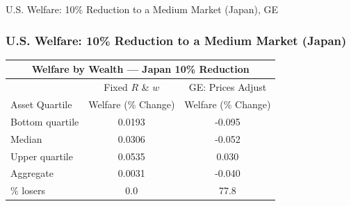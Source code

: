 \documentclass[9pt,pdftex,aspectratio=1610]{beamer}
\theoremstyle{definition}
\begin{document}
\begin{frame}[t]{U.S. Welfare: 10\% Reduction to a Medium Market (Japan), {\color{red} GE} }
\vspace{-.5cm}
\begin{figure}[!t]
\end{figure}
\end{frame}

\begin{frame}[t]
\frametitle{U.S. Welfare: 10\% Reduction to a Medium Market (Japan)}
\begin{table}[t]
\footnotesize
\setlength {\tabcolsep}{6.05mm}
\renewcommand{\arraystretch}{1.80}
\begin{center}
\begin{tabular}{l c c}
\multicolumn{3}{c}{\small \textbf{Welfare by Wealth --- Japan {\color{red} 10\%} Reduction}}\\
\hline
\hline
& \footnotesize  Fixed $R$ \& $w$ & GE: Prices Adjust \\
\cmidrule(lr){2-2}  \cmidrule(lr){3-3}
\footnotesize  Asset Quartile & \footnotesize  Welfare (\% Change) & \footnotesize  Welfare (\% Change) \\
\footnotesize  Bottom quartile  & 0.0193 & -0.095 \\
\footnotesize  Median & 0.0306 & -0.052 \\
\footnotesize  Upper quartile  & 0.0535 & 0.030  \\
\footnotesize  Aggregate & 0.0031 & -0.040 \\
\cmidrule(lr){2-2}  \cmidrule(lr){3-3}
\footnotesize  \% losers & 0.0 & 77.8\\
\hline
\end{tabular}
\end{center}
\end{table}
\end{frame}
\end{document}
